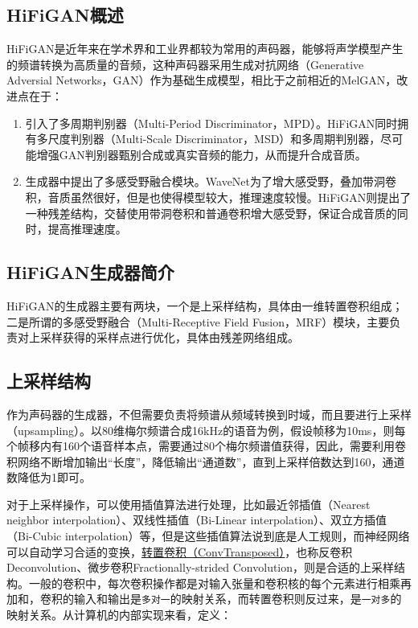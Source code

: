 \documentclass[cn,10pt,math=newtx,citestyle=gb7714-2015,bibstyle=gb7714-2015]{elegantbook}
\begin{document}
\subsection{HiFiGAN概述}

HiFiGAN是近年来在学术界和工业界都较为常用的声码器，能够将声学模型产生的频谱转换为高质量的音频，这种声码器采用生成对抗网络（Generative Adversial Networks，GAN）作为基础生成模型，相比于之前相近的MelGAN，改进点在于：

\begin{enumerate}
  \item 引入了多周期判别器（Multi-Period Discriminator，MPD）。HiFiGAN同时拥有多尺度判别器（Multi-Scale Discriminator，MSD）和多周期判别器，尽可能增强GAN判别器甄别合成或真实音频的能力，从而提升合成音质。
  \item 生成器中提出了多感受野融合模块。WaveNet为了增大感受野，叠加带洞卷积，音质虽然很好，但是也使得模型较大，推理速度较慢。HiFiGAN则提出了一种残差结构，交替使用带洞卷积和普通卷积增大感受野，保证合成音质的同时，提高推理速度。
\end{enumerate}

\subsection{HiFiGAN生成器简介}

HiFiGAN的生成器主要有两块，一个是上采样结构，具体由一维转置卷积组成；二是所谓的多感受野融合（Multi-Receptive Field Fusion，MRF）模块，主要负责对上采样获得的采样点进行优化，具体由残差网络组成。

\subsection{上采样结构}

作为声码器的生成器，不但需要负责将频谱从频域转换到时域，而且要进行上采样（upsampling）。以80维梅尔频谱合成16kHz的语音为例，假设帧移为10ms，则每个帧移内有160个语音样本点，需要通过80个梅尔频谱值获得，因此，需要利用卷积网络不断增加输出“长度”，降低输出“通道数”，直到上采样倍数达到160，通道数降低为1即可。

对于上采样操作，可以使用插值算法进行处理，比如最近邻插值（Nearest neighbor interpolation）、双线性插值（Bi-Linear interpolation）、双立方插值（Bi-Cubic interpolation）等，但是这些插值算法说到底是人工规则，而神经网络可以自动学习合适的变换，\href{https://pytorch.org/docs/master/generated/torch.nn.ConvTranspose1d.html}{转置卷积（ConvTransposed）}，也称反卷积Deconvolution、微步卷积Fractionally-strided Convolution，则是合适的上采样结构。一般的卷积中，每次卷积操作都是对输入张量和卷积核的每个元素进行相乘再加和，卷积的输入和输出是\lstinline{多对一}的映射关系，而转置卷积则反过来，是\lstinline{一对多}的映射关系。从计算机的内部实现来看，定义：
\end{document}

